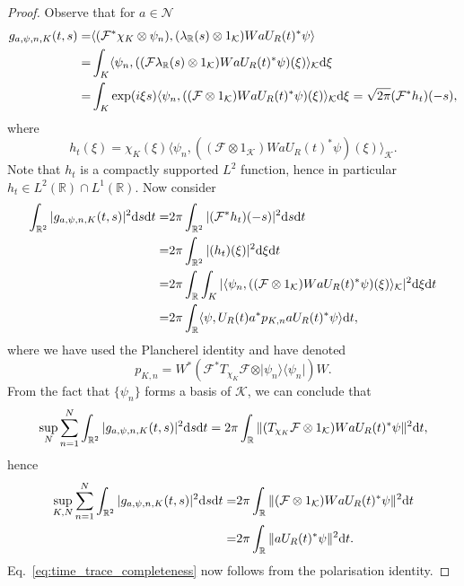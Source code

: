 \documentclass[sn-mathphys-num]{sn-jnl}%
\newcommand{\RR}{\mathbb{R}}
\newcommand{\KK}{\mathcal{K}}
\newcommand{\diff}{\textup{d}}
\numberwithin{equation}{section}
\theoremstyle{thmstyleone}%
\theoremstyle{thmstyletwo}%
\theoremstyle{thmstylethree}%
\begin{document}
\begin{proof}
    Observe that for $a\in\mathcal{N}$
    \begin{align}
        g_{a,\psi,n,K}(t,s)=&\langle (\mathcal{F}^*\chi_K\otimes \psi_n),(\lambda_\RR(s)\otimes 1_\KK)Wa U_R(t)^*\psi\rangle\nonumber\\
        =&\int_K\langle \psi_n,((\mathcal{F}\lambda_\RR(s)\otimes 1_\KK)Wa U_R(t)^*\psi)(\xi)\rangle_\KK\diff\xi\nonumber\\
        =&\int_K\exp(i\xi s)\langle \psi_n,((\mathcal{F}\otimes 1_\KK)Wa U_R(t)^*\psi)(\xi)\rangle_\KK\diff\xi
        =\sqrt{2\pi}(\mathcal{F}^*h_t)(-s),
    \end{align}
    where 
    \begin{equation}
        h_t(\xi)=\chi_K(\xi)\langle \psi_n,((\mathcal{F}\otimes 1_\KK)Wa U_R(t)^*\psi)(\xi)\rangle_\KK.
    \end{equation}
    Note that $h_t$ is a compactly supported $L^2$ function, hence in particular $h_t\in L^2(\RR)\cap L^1(\RR)$.
    Now consider 
    \begin{align}
        \int_{\RR^2}\vert g_{a,\psi,n,K}(t,s)\vert^2\diff s\diff t=&2\pi\int_{\RR^2}\vert(\mathcal{F}^*h_t)(-s)\vert^2\diff s\diff t\nonumber\\
        =&2\pi\int_{\RR^2}\vert(h_t)(\xi)\vert^2\diff \xi\diff t\nonumber\\
        =&2\pi\int_\RR\int_K \vert\langle \psi_n,((\mathcal{F}\otimes 1_\KK)Wa U_R(t)^*\psi)(\xi)\rangle_\KK\vert^2\diff\xi\diff t\nonumber\\
        =&2\pi\int_\RR\langle \psi,U_R(t)a^*p_{K,n}aU_R(t)^*\psi\rangle\diff t,
    \end{align}
    where we have used the Plancherel identity and have denoted 
    \begin{equation}
        p_{K,n}=W^*\left(\mathcal{F}^*T_{\chi_K}\mathcal{F}\otimes \vert\psi_n\rangle\langle\psi_n\vert\right)W.
    \end{equation} From the fact that $\{\psi_n\}$ forms a basis of $\KK$, we can conclude that
    \begin{equation}
        \sup_{N}\sum_{n=1}^N\int_{\RR^2}\vert g_{a,\psi,n,K}(t,s)\vert^2\diff s\diff t=2\pi\int_\RR\Vert(T_{\chi_K}\mathcal{F}\otimes 1_\KK)Wa U_R(t)^*\psi\Vert^2\diff t,
    \end{equation}
    hence
    \begin{align}
         \sup_{K,N}\sum_{n=1}^N\int_{\RR^2}\vert g_{a,\psi,n,K}(t,s)\vert^2\diff s\diff t=&2\pi\int_\RR\Vert(\mathcal{F}\otimes 1_\KK)Wa U_R(t)^*\psi\Vert^2\diff t\nonumber\\=&2\pi\int_\RR\Vert a U_R(t)^*\psi\Vert^2\diff t.
    \end{align}
    Eq.~\eqref{eq:time_trace_completeness} now follows from the polarisation identity.
\end{proof}
\end{document}
